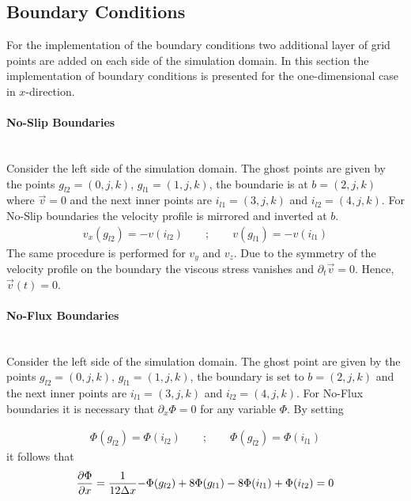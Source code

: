 \subsection{Boundary Conditions}
\label{sec:cuda_boundaries}

For the implementation of the boundary conditions two additional layer of grid points are added on each side of the simulation domain.
In this section the implementation of boundary conditions is presented for the one-dimensional case in $x$-direction.

\paragraph{No-Slip Boundaries}\mbox{}\\

Consider the left side of the simulation domain.
The ghost points are given by the points ${g_{l2}=(0, j, k)}$, ${g_{l1}=(1, j, k)}$,
the boundarie is at ${b=(2, j, k)}$ where $\vec{v}=0$ and the next inner points are
$i_{l1}=(3, j, k)$ and $i_{l2}=(4, j, k)$.
For No-Slip boundaries the velocity profile is mirrored and inverted at $b$.
\begin{align}
    v_x(g_{l2}) = -v(i_{l2}) \qquad ; \qquad v(g_{l1}) = -v(i_{l1})
\end{align}
The same procedure is performed for $v_y$ and $v_z$.
Due to the symmetry of the velocity profile on the boundary the viscous stress vanishes and $\partial_t\vec{v} = 0$. Hence, $\vec{v}(t)=0$.


\paragraph{No-Flux Boundaries}\mbox{}\\

Consider the left side of the simulation domain.
The ghost point are given by the points ${g_{l2}=(0, j, k)}$, ${g_{l1}=(1, j, k)}$,
the boundary is set to  ${b=(2, j, k)}$ and the next inner points are
$i_{l1}=(3, j, k)$ and $i_{l2}=(4, j, k)$.
For No-Flux boundaries it is necessary that $\partial_x\Phi = 0$ for any variable $\Phi$.
By setting

\begin{align}
    \Phi(g_{l2}) = \Phi(i_{l2})\qquad ; \qquad \Phi(g_{l2}) = \Phi(i_{l1})
\end{align}
it follows that
\begin{align}
    \pdn[\Phi]{x} = \frac{1}{12\Delta x}{-\Phi(g_{l2})+8\Phi(g_{l1}) -8\Phi(i_{l1}) + \Phi(i_{l2})} = 0
\end{align}

